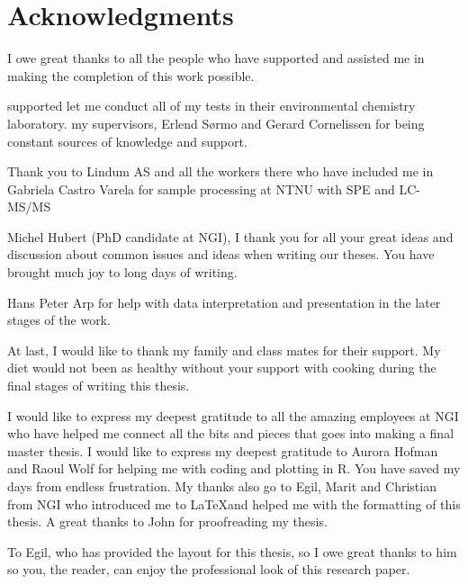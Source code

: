 \newpage
{}
\section*{Acknowledgments}
I owe great thanks to all the people who have supported and assisted me in making the completion of this work possible. 

supported let me conduct all of my tests in their environmental chemistry laboratory.
my supervisors, Erlend Sørmo and Gerard Cornelissen for being constant sources of knowledge and support. 
  

Thank you to Lindum AS and all the workers there  who have included me in 
Gabriela Castro Varela for sample processing at NTNU with SPE and LC-MS/MS

Michel Hubert (PhD candidate at NGI), I thank you for all your great ideas and discussion about common issues and ideas when writing our theses. You have brought much joy to long days of writing. 

Hans Peter Arp for help with data interpretation and presentation in the later stages of the work. 

At last, I would like to thank my family and class mates for their support. My diet would not been as healthy without your support with cooking during the final stages of writing this thesis. 

I would like to express my deepest gratitude to all the amazing employees at NGI who have helped me connect all the bits and pieces that goes into making a final master thesis. 
I would like to express my deepest gratitude to Aurora Hofman and Raoul Wolf for helping me with coding and plotting in R. You have saved my days from endless frustration. My thanks also go to Egil, Marit and Christian from NGI who introduced me to \LaTeX and helped me with the formatting of this thesis. A great thanks to John for proofreading my thesis. 

To Egil, who has provided the layout for this thesis, so I owe great thanks to him so you, the reader, can enjoy the professional look of this research paper. 